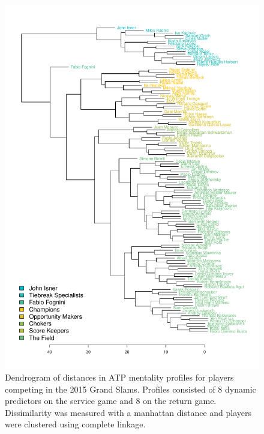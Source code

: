 \documentclass{Latex/svjour3}
\begin{document}
\begin{figure}
\includegraphics[scale=0.9]{figs/atp_dendro_std_fixed.pdf}
\caption{Dendrogram of distances in ATP mentality profiles for players
competing in the 2015 Grand Slams. Profiles consisted of 8 dynamic
predictors on the service game and 8 on the return game. Dissimilarity
was measured with a manhattan distance and players were clustered
using complete linkage.}
\label{fig:atp_dendro}
\end{figure}

\clearpage
\end{document}
